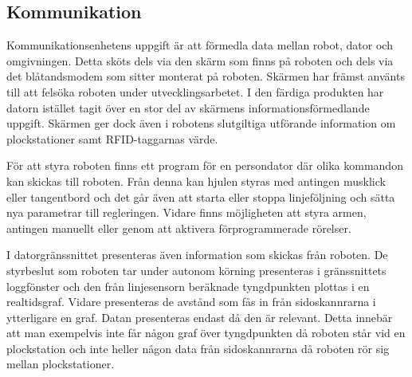 

\subsection{Kommunikation}

Kommunikationsenhetens uppgift är att förmedla data mellan robot, dator och omgivningen. Detta sköts dels via den skärm som finns på roboten och dels via det blåtandsmodem som sitter monterat på roboten. Skärmen har främst använts till att felsöka roboten under utvecklingsarbetet. I den färdiga produkten har datorn istället tagit över en stor del av skärmens informationsförmedlande uppgift. Skärmen ger dock även i robotens slutgiltiga utförande information om plockstationer samt RFID-taggarnas värde.

För att styra roboten finns ett program för en persondator där olika kommandon kan skickas till roboten. Från denna kan hjulen styras med antingen musklick eller tangentbord och det går även att starta eller stoppa linjeföljning och sätta nya parametrar till regleringen. Vidare finns möjligheten att styra armen, antingen manuellt eller genom att aktivera förprogrammerade rörelser.

I datorgränssnittet presenteras även information som skickas från roboten. De styrbeslut som roboten tar under autonom körning presenteras i gränssnittets loggfönster och den från linjesensorn beräknade tyngdpunkten plottas i en realtidsgraf. Vidare presenteras de avstånd som fås in från sidoskannrarna i ytterligare en graf. Datan presenteras endast då den är relevant. Detta innebär att man exempelvis inte får någon graf över tyngdpunkten då roboten står vid en plockstation och inte heller någon data från sidoskannrarna då roboten rör sig mellan plockstationer.





